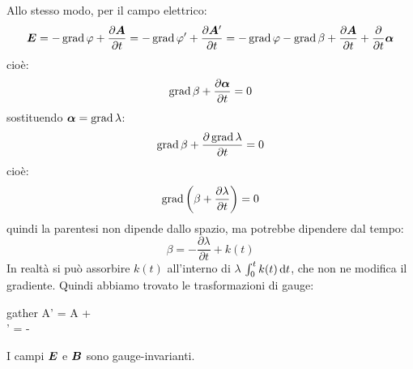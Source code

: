 Allo stesso modo, per il campo elettrico:
\begin{equation}
  \boldsymbol{E} = -\operatorname{grad}\varphi + \frac{\partial\boldsymbol{A}}{\partial t} = -\operatorname{grad}\varphi' + \frac{\partial\boldsymbol{A}'}{\partial t} = -\operatorname{grad}\varphi -\operatorname{grad}\beta +  \frac{\partial\boldsymbol{A}}{\partial t} +\frac{\partial}{\partial t}\boldsymbol{\alpha}
\end{equation}
cioè:
\begin{equation}
  \operatorname{grad}\beta + \frac{\partial\boldsymbol{\alpha}}{\partial t} = 0
\end{equation}
sostituendo $\boldsymbol{\alpha}=\operatorname{grad}\lambda$:
\begin{equation}
  \operatorname{grad}\beta + \frac{\partial\operatorname{grad} \lambda}{\partial t} = 0
\end{equation}
cioè:
\begin{equation}
  \operatorname{grad}\left(\beta + \frac{\partial\lambda}{\partial t}\right) = 0
\end{equation}
quindi la parentesi non dipende dallo spazio, ma potrebbe dipendere dal tempo:
\begin{equation}
  \beta =- \frac{\partial\lambda}{\partial t} +k(t)
\end{equation}
In realtà si può assorbire $k(t)$ all'interno di $\lambda$ $\int_0^t k(t)\,\mathrm{d} t$, che non ne modifica il gradiente. Quindi abbiamo trovato le trasformazioni di gauge:
\begin{eqimp}{gather}
  \ve A' = \ve A + \grad\lambda \\
  \varphi' = \varphi - 
\end{eqimp}
I campi $\boldsymbol{E}$ e $\boldsymbol{B}$ sono gauge-invarianti.




